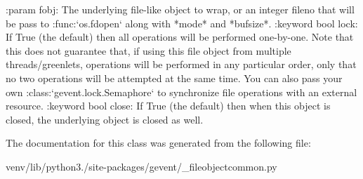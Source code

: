 \begin{DoxyVerb}:param fobj: The underlying file-like object to wrap, or an integer fileno
   that will be pass to :func:`os.fdopen` along with *mode* and *bufsize*.
:keyword bool lock: If True (the default) then all operations will
   be performed one-by-one. Note that this does not guarantee that, if using
   this file object from multiple threads/greenlets, operations will be performed
   in any particular order, only that no two operations will be attempted at the
   same time. You can also pass your own :class:`gevent.lock.Semaphore` to synchronize
   file operations with an external resource.
:keyword bool close: If True (the default) then when this object is closed,
   the underlying object is closed as well.
\end{DoxyVerb}
 

The documentation for this class was generated from the following file\+:\begin{DoxyCompactItemize}
\item 
venv/lib/python3./site-\/packages/gevent/\+\_\+fileobjectcommon.\+py\end{DoxyCompactItemize}
